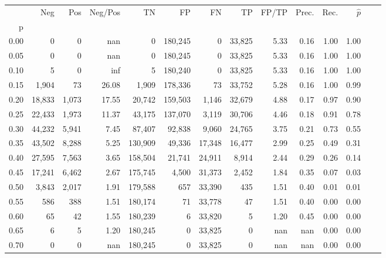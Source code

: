 \begin{tabular}{rrrrrrrrrrrrrr}
\toprule
{} &     Neg &    Pos & Neg/Pos &       TN &       FP &      FN &      TP & FP/TP & Prec. &  Rec. & $\hat{p}$ \\
p    &         &        &         &          &          &         &         &       &       &       &           \\
\midrule
0.00 &       0 &      0 &     nan &        0 &  180,245 &       0 &  33,825 &  5.33 &  0.16 &  1.00 &      1.00 \\
0.05 &       0 &      0 &     nan &        0 &  180,245 &       0 &  33,825 &  5.33 &  0.16 &  1.00 &      1.00 \\
0.10 &       5 &      0 &     inf &        5 &  180,240 &       0 &  33,825 &  5.33 &  0.16 &  1.00 &      1.00 \\
0.15 &   1,904 &     73 &   26.08 &    1,909 &  178,336 &      73 &  33,752 &  5.28 &  0.16 &  1.00 &      0.99 \\
0.20 &  18,833 &  1,073 &   17.55 &   20,742 &  159,503 &   1,146 &  32,679 &  4.88 &  0.17 &  0.97 &      0.90 \\
0.25 &  22,433 &  1,973 &   11.37 &   43,175 &  137,070 &   3,119 &  30,706 &  4.46 &  0.18 &  0.91 &      0.78 \\
0.30 &  44,232 &  5,941 &    7.45 &   87,407 &   92,838 &   9,060 &  24,765 &  3.75 &  0.21 &  0.73 &      0.55 \\
0.35 &  43,502 &  8,288 &    5.25 &  130,909 &   49,336 &  17,348 &  16,477 &  2.99 &  0.25 &  0.49 &      0.31 \\
0.40 &  27,595 &  7,563 &    3.65 &  158,504 &   21,741 &  24,911 &   8,914 &  2.44 &  0.29 &  0.26 &      0.14 \\
0.45 &  17,241 &  6,462 &    2.67 &  175,745 &    4,500 &  31,373 &   2,452 &  1.84 &  0.35 &  0.07 &      0.03 \\
0.50 &   3,843 &  2,017 &    1.91 &  179,588 &      657 &  33,390 &     435 &  1.51 &  0.40 &  0.01 &      0.01 \\
0.55 &     586 &    388 &    1.51 &  180,174 &       71 &  33,778 &      47 &  1.51 &  0.40 &  0.00 &      0.00 \\
0.60 &      65 &     42 &    1.55 &  180,239 &        6 &  33,820 &       5 &  1.20 &  0.45 &  0.00 &      0.00 \\
0.65 &       6 &      5 &    1.20 &  180,245 &        0 &  33,825 &       0 &   nan &   nan &  0.00 &      0.00 \\
0.70 &       0 &      0 &     nan &  180,245 &        0 &  33,825 &       0 &   nan &   nan &  0.00 &      0.00 \\

\end{tabular}
